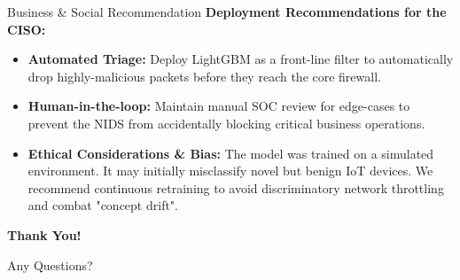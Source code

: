 \documentclass[10pt,aspectratio=169]{beamer}
\begin{document}
\begin{frame}{Business \& Social Recommendation}
    \textbf{Deployment Recommendations for the CISO:}
    \vspace{0.3cm}
    \begin{itemize}
        \item \textbf{Automated Triage:} Deploy LightGBM as a front-line filter to automatically drop highly-malicious packets before they reach the core firewall.
        \item \textbf{Human-in-the-loop:} Maintain manual SOC review for edge-cases to prevent the NIDS from accidentally blocking critical business operations.
        \item \textbf{Ethical Considerations \& Bias:} The model was trained on a simulated environment. It may initially misclassify novel but benign IoT devices. We recommend continuous retraining to avoid discriminatory network throttling and combat "concept drift".
    \end{itemize}
\end{frame}

\begin{frame}
    \centering
    \Huge \textbf{Thank You!}
    
    \vspace{1cm}
    \Large Any Questions?
\end{frame}
\end{document}
